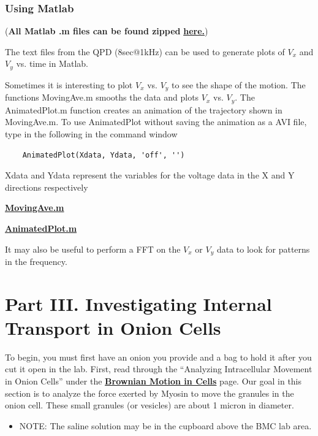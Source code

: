 \documentclass{../lab}
\begin{document}
\subsubsection{Using Matlab}

(\textbf{All Matlab .m files can be found zipped }\href{http://experimentationlab.berkeley.edu/sites/default/files/ZIP\_files/OTZ\_Matlab\_files.zip}{\textbf{here.}})

The text files from the QPD (8sec@1kHz) can be used to generate plots of $V_x$ and $V_y$ vs. time in Matlab.

Sometimes it is interesting to plot $V_x$ vs. $V_y$ to see the shape of the motion. The functions MovingAve.m smooths the data and plots $V_x$ vs. $V_y$. The AnimatedPlot.m function creates an animation of the trajectory shown in MovingAve.m. To use AnimatedPlot without saving the animation as a AVI file, type in the following in the command window
\begin{verbatim}
    AnimatedPlot(Xdata, Ydata, 'off', '')
\end{verbatim}
Xdata and Ydata represent the variables for the voltage data in the X and Y directions respectively

\href{http://experimentationlab.berkeley.edu/sites/default/files/matlab\_fitting/MovingAve.m}{\textbf{MovingAve.m}}

\href{http://experimentationlab.berkeley.edu/sites/default/files/matlab\_fitting/AnimatedPlot.m}{\textbf{AnimatedPlot.m}}

It may also be useful to perform a FFT on the $V_x$ or $V_y$ data to look for patterns in the frequency.

\section{Part III. Investigating Internal Transport in Onion Cells}

To begin, you must first have an onion you provide and a bag to hold it after you cut it open in the lab. First, read through the ``Analyzing Intracellular Movement in Onion Cells'' under the \href{http://experimentationlab.berkeley.edu/BMC}{\textbf{Brownian Motion in Cells}} page. Our goal in this section is to analyze the force exerted by Myosin to move the granules in the onion cell. These small granules (or vesicles) are about 1 micron in diameter.

\begin{itemize}
    \item NOTE: The saline solution may be in the cupboard above the BMC lab area.

\end{itemize}
\end{document}
